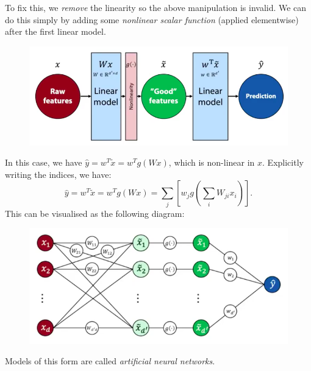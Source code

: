 \newpage
To fix this, we \textit{remove} the linearity so the above manipulation is invalid. We can do this simply by adding some \textit{nonlinear scalar function} (applied elementwise) after the first linear model. 
\begin{figure}[H]
\centering
\includegraphics[scale=0.3]{nonlinearstacking.png}
\end{figure}
In this case, we have $\hat{y} = w^T \tilde{x} = w^T g(Wx)$, which is non-linear in $x$. Explicitly writing the indices, we have:
\begin{equation*}
\hat{y} = w^T \tilde{x} = w^T g(Wx) = \sum_{j} \left[w_j g\left( \sum_{i} W_{ji} x_i \right) \right].
\end{equation*}
This can be visualised as the following diagram:
\begin{figure}[H]
\centering
\includegraphics[scale=0.3]{basicnetwork.png}
\end{figure}
Models of this form are called \textit{artificial neural networks}.\\

